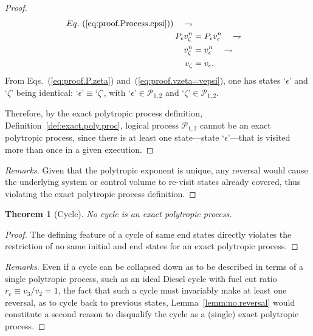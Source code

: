 \documentclass[fleqn,11pt]{SelfArx}
\newtheorem{theorem}{Theorem}
\begin{document}
\begin{proof}
\begin{align}
{            Eq.~(\ref{eq:proof.Process.epsi}))}\quad\rightharpoondown
            \label{eq:proof.Process.zeta} \\
            P_{\epsilon}v_{\zeta}^n & = P_{\epsilon}v_{\epsilon}^n \quad\rightharpoondown \\
            v_{\zeta}^n & = v_{\epsilon}^n \quad\rightharpoondown \\
            v_{\zeta} & = v_{\epsilon}.
            \label{eq:proof.vzeta=vepsi}
        \end{align}
        From  Eqs.~(\ref{eq:proof.P.zeta})  and~(\ref{eq:proof.vzeta=vepsi}),  one  has   states
        `$\epsilon$'   and   `$\zeta$'   being   identical:   $\mbox{`}\epsilon\mbox{'}   \equiv
        \mbox{`}\zeta\mbox{'}$,  with  $\mbox{`}\epsilon\mbox{'}  \in   \mathcal{P}_{1,2}$   and
        $\mbox{`}\zeta\mbox{'} \in \mathcal{P}_{1,2}$.

        Therefore,      by      the       exact       polytropic       process       definition,
        Definition~\ref{def:exact.poly.proc}, logical process $\mathcal{P}_{1,2}$ cannot  be  an
        exact polytropic process, since there is at least one state---state  `$\epsilon$'---that
        is visited more than once in a given execution.
    \end{proof}

    \begin{proof}[Remarks]
        Given that the polytropic exponent is unique, any reversal would  cause  the  underlying
        system or control volume to re-visit states already covered, thus  violating  the  exact
        polytropic process definition.
    \end{proof}

    \begin{theorem}[Cycle]\label{theo:cycle}
        No cycle is an exact polytropic process.
    \end{theorem}

    \begin{proof}
        The defining feature of a cycle of same end states directly violates the restriction  of
        no same initial and end states for an exact polytropic process.
    \end{proof}

    \begin{proof}[Remarks]
        Even if a cycle can be collapsed down as to be described in terms of a single polytropic
        process, such as an ideal Diesel cycle with fuel cut ratio $r_c \equiv v_3 / v_2  =  1$,
        the fact that such a cycle must invariably make at least one reversal, as to cycle  back
        to previous states, Lemma~\ref{lemm:no.reversal} would constitute  a  second  reason  to
        disqualify the cycle as a (single) exact polytropic process.
    \end{proof}
\end{document}
